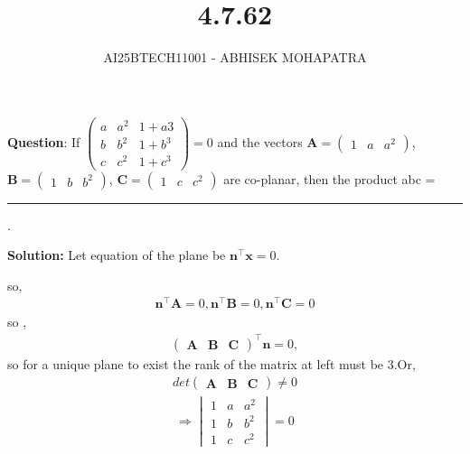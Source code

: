 \documentclass{beamer}
\title{4.7.62}
\author{AI25BTECH11001 - ABHISEK MOHAPATRA}
\theoremstyle{remark}
\newcommand{\myvec}[1]{\ensuremath{\begin{pmatrix}#1\end{pmatrix}}}
\newcommand{\mydet}[1]{\ensuremath{\begin{vmatrix}#1\end{vmatrix}}}
\let\vec\mathbf
\numberwithin{equation}{section}
\begin{document}
{\let\newpage\relax\maketitle}
\renewcommand{\thefigure}{\theenumi}
\renewcommand{\thetable}{\theenumi}


	 	\textbf{Question}:
If $\myvec{a &a^2 &1+ a3\\ b & b^2 & 1 + b^3\\c & c^2 & 1 + c^3} = 0$ and the vectors $\vec{A}=\myvec{1 & a & a^2}$, $\vec{B}=\myvec{1 & b & b^2}$, $\vec{C}=\myvec{1 & c & c^2}$ are co-planar, then the product abc = \rule{1cm}{0.15mm}.
		

		\textbf{Solution:} 
Let equation of the plane be $\vec{n}^\top\vec{x}=0$.

so, 
\begin{align}
\vec{n}^\top\vec{A}=0,
\vec{n}^\top\vec{B}=0,
\vec{n}^\top\vec{C}=0
\end{align}
so ,
\begin{align}
		\myvec{\vec{A}&\vec{B}&\vec{C}}^\top\vec{n}=0,
\end{align}
so for a unique plane to exist the rank of the matrix at left must be 3.Or, 
\begin{align}
		det\myvec{\vec{A}&\vec{B}&\vec{C}} \neq 0
\end{align}
\begin{align}
		\Rightarrow \mydet{1&a &a^2 \\1& b & b^2 \\1& c & c^2}	= 0
\end{align}
\end{document}

